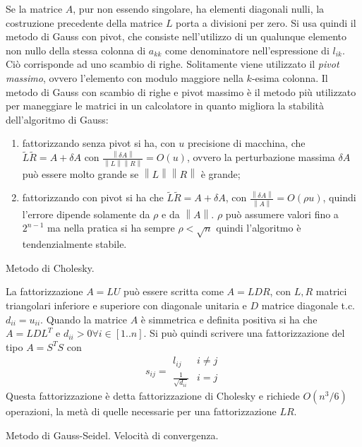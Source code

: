 \documentclass[answers, a4paper]{exam}
\newcommand{\norm}[1]{\left\lVert#1\right\rVert}
\begin{document}
\begin{questions}
\begin{solution}
		Se la matrice $A$, pur non essendo singolare, ha elementi diagonali nulli, la costruzione precedente della matrice $L$ porta a divisioni per zero.
		Si usa quindi il metodo di Gauss con pivot, che consiste nell'utilizzo di un qualunque elemento non nullo della stessa colonna di $a_{kk}$ come denominatore nell'espressione di $l_{ik}$.
		Ciò corrisponde ad uno scambio di righe.
		Solitamente viene utilizzato il \textit{pivot massimo}, ovvero l'elemento con modulo maggiore nella $k$-esima colonna.
		Il metodo di Gauss con scambio di righe e pivot massimo è il metodo più utilizzato per maneggiare le matrici in un calcolatore in quanto migliora la stabilità dell’algoritmo di Gauss: \begin{enumerate}
			\item fattorizzando senza pivot si ha, con $u$ precisione di macchina, che  $\tilde{L}\tilde{R} = A + \delta A$ con $\frac{\norm{\delta A}}{\norm{L}\norm{R}} = O(u)$, ovvero la perturbazione massima $\delta A$ può essere molto grande se $\norm{L}\norm{R}$ è grande; 
			\item fattorizzando con pivot si ha che $\tilde{L}\tilde{R} = A + \delta A$, con $\frac{\norm{\delta A}}{\norm{A}} = O(\rho u)$, quindi l'errore dipende solamente da $\rho$ e da $\norm{A}$.
			$\rho$ può assumere valori fino a $2^{n - 1}$ ma nella pratica si ha sempre $\rho < \sqrt{n}$ quindi l'algoritmo è tendenzialmente stabile.
		\end{enumerate}
	\end{solution}
	\question Metodo di Cholesky.
	\begin{solution}
		La fattorizzazione $A = LU$ può essere scritta come $A = LDR$, con $L, R$ matrici triangolari inferiore e superiore con diagonale unitaria e $D$ matrice diagonale t.c. $d_{ii} = u_{ii}$. 
		Quando la matrice $A$ è simmetrica e definita positiva si ha che $A = L D L^T$ e $d_{ii} > 0 \forall i \in [1..n]$. 
		Si può quindi scrivere una fattorizzazione del tipo $A = S^T S$ con \begin{equation}s_{ij} = 
		\begin{array}{lcl} 
			l_{ij} & i\neq j  \\
			\frac{1}{\sqrt{d_{ii}}} & i = j
		\end{array}
	\end{equation}
		Questa fattorizzazione è detta fattorizzazione di Cholesky e richiede $O(n^3 / 6)$ operazioni, la metà di quelle necessarie per una fattorizzazione $LR$.
	\end{solution}
	\question Metodo di Gauss-Seidel. Velocità di convergenza.

\end{questions}
\end{document}
